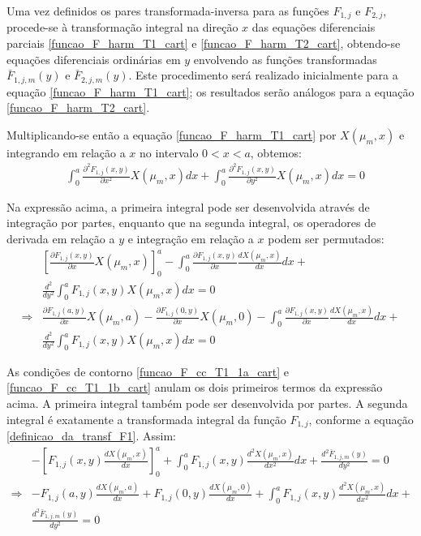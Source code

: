 Uma vez definidos os pares transformada-inversa para as funções $F_{1,j}$ e $F_{2,j}$, procede-se à transformação integral na direção $x$ das equações
diferenciais parciais \eqref{funcao_F_harm_T1_cart} e \eqref{funcao_F_harm_T2_cart}, obtendo-se equações diferenciais ordinárias em $y$ envolvendo
as funções transformadas $\bar{F}_{1,j,m}(y)$ e $\bar{F}_{2,j,m}(y)$. Este procedimento será realizado inicialmente para a equação \eqref{funcao_F_harm_T1_cart};
os resultados serão análogos para a equação \eqref{funcao_F_harm_T2_cart}.

Multiplicando-se então a equação \eqref{funcao_F_harm_T1_cart} por $X(\mu_m, x)$ e integrando em relação a $x$ no intervalo $0 < x < a$, obtemos: 
\begin{align}
& \int_0^a  \frac{\partial^2 F_{1,j}(x, y)}{\partial x^2}X(\mu_m, x)dx + \int_0^a \frac{\partial^2 F_{1,j}(x, y)}{\partial y^2}X(\mu_m, x)dx = 0 
\end{align}

Na expressão acima, a primeira integral pode ser desenvolvida através de integração por partes, enquanto que na segunda integral, os operadores de derivada
em relação a $y$ e integração em relação a $x$ podem ser permutados:
\begin{align}
& \left[ \frac{\partial F_{1,j}(x, y)}{\partial x}X(\mu_m, x) \right]_0^a
-
\int_0^a  \frac{\partial F_{1,j}(x, y)}{\partial x}\frac{dX(\mu_m, x)}{dx} dx + \nonumber \\
& \frac{d^2}{d y^2}\int_0^a F_{1,j}(x, y)X(\mu_m, x)dx = 0 \nonumber \\ 
\Rightarrow & \frac{\partial F_{1,j}(a, y)}{\partial x}X(\mu_m, a) - \frac{\partial F_{1,j}(0, y)}{\partial x}X(\mu_m, 0)
-
\int_0^a  \frac{\partial F_{1,j}(x, y)}{\partial x}\frac{dX(\mu_m, x)}{dx} dx + \nonumber \\
& \frac{d^2}{d y^2}\int_0^a F_{1,j}(x, y)X(\mu_m, x)dx = 0
\end{align}

As condições de contorno \eqref{funcao_F_cc_T1_1a_cart} e \eqref{funcao_F_cc_T1_1b_cart} anulam os dois primeiros termos da expressão acima. A primeira
integral também pode ser desenvolvida por partes. A segunda integral é exatamente a transformada integral da função $F_{1, j}$, conforme a equação \eqref{definicao_da_transf_F1}.
Assim:
\begin{align}
&
- \left[ F_{1,j}(x, y)\frac{dX(\mu_m, x)}{dx} \right]_0^a
+ \int_0^a  F_{1,j}(x, y)\frac{d^2X(\mu_m, x)}{dx^2} dx + \frac{d^2 \bar{F}_{1,j,m}(y)}{d y^2} = 0 \nonumber \\
\Rightarrow &
- F_{1,j}(a, y)\frac{dX(\mu_m, a)}{dx}+ F_{1,j}(0, y)\frac{dX(\mu_m, 0)}{dx} + \int_0^a  F_{1,j}(x, y)\frac{d^2X(\mu_m, x)}{dx^2} dx + \nonumber \\
& \frac{d^2 \bar{F}_{1,j,m}(y)}{d y^2} = 0
\end{align}

